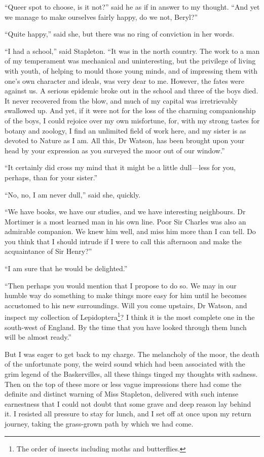 \documentclass[paper=5.5in:8.5in,BCOR=7mm,twoside,DIV=calc,12pt,usegeometry,openany,chapterprefix,endperiod]{scrbook} %
\begin{document}
\enquote{Queer spot to choose, is it not?} said he as if in answer to my thought. \enquote{And yet we manage to make ourselves fairly happy, do we not, Beryl?}

\enquote{Quite happy,} said she, but there was no ring of conviction in her words.

\enquote{I had a school,} said Stapleton. \enquote{It was in the north country. The work to a man of my temperament was mechanical and uninteresting, but the privilege of living with youth, of helping to mould those young minds, and of impressing them with one's own character and ideals, was very dear to me. However, the fates were against us. A serious epidemic broke out in the school and three of the boys died. It never recovered from the blow, and much of my capital was irretrievably swallowed up. And yet, if it were not for the loss of the charming companionship of the boys, I could rejoice over my own misfortune, for, with my strong tastes for botany and zoology, I find an unlimited field of work here, and my sister is as devoted to Nature as I am. All this, Dr Watson, has been brought upon your head by your expression as you surveyed the moor out of our window.}

\enquote{It certainly did cross my mind that it might be a little dull\nobreakdash---less for you, perhaps, than for your sister.}

\enquote{No, no, I am never dull,} said she, quickly.

\enquote{We have books, we have our studies, and we have interesting neighbours. Dr Mortimer is a most learned man in his own line. Poor Sir Charles was also an admirable companion. We knew him well, and miss him more than I can tell. Do you think that I should intrude if I were to call this afternoon and make the acquaintance of Sir Henry?}

\enquote{I am sure that he would be delighted.}

\enquote{Then perhaps you would mention that I propose to do so. We may in our humble way do something to make things more easy for him until he becomes accustomed to his new surroundings. Will you come upstairs, Dr Watson, and inspect my collection of Lepidoptera\footnote{The order of insects including moths and butterflies.}? I think it is the most complete one in the south-west of England. By the time that you have looked through them lunch will be almost ready.}

But I was eager to get back to my charge. The melancholy of the moor, the death of the unfortunate pony, the weird sound which had been associated with the grim legend of the Baskervilles, all these things tinged my thoughts with sadness. Then on the top of these more or less vague impressions there had come the definite and distinct warning of Miss Stapleton, delivered with such intense earnestness that I could not doubt that some grave and deep reason lay behind it. I resisted all pressure to stay for lunch, and I set off at once upon my return journey, taking the grass-grown path by which we had come.
\end{document}
